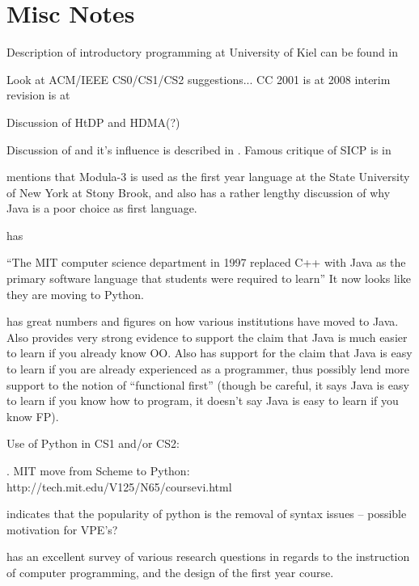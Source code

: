 \label{chapter:problem}

\section{Misc Notes}

Description of introductory programming at University of Kiel can be found in \cite{Huch05}

Look at ACM/IEEE CS0/CS1/CS2 suggestions...  CC 2001 is at \cite{cc2001} 2008 interim revision is at \cite{cs2008}

Discussion of HtDP and HDMA(?)

Discussion of \cite{SICPbook} and it's influence is described in \cite{Flatt04}.  Famous critique of SICP is in \cite{Wadler87}

\cite{Bos98} mentions that Modula-3 is used as the first year language at the State University of New York at Stony Brook, and also has a rather lengthy discussion of why Java is a poor choice as first language.

\cite{Mahmoud04} has 


``The MIT computer science department in 1997 replaced C++ with Java as the primary software language that students were required to learn'' \cite{Benander04}  It now looks like they are moving to Python.

\cite{Benander04} has great numbers and figures on how various institutions have moved to Java.  Also provides very strong evidence to support the claim that Java is much easier to learn if you already know OO.  Also has support for the claim that Java is easy to learn if you are already experienced as a programmer, thus possibly lend more support to the notion of ``functional first'' (though be careful, it says Java is easy to learn if you know how to program, it doesn't say Java is easy to learn if you know FP).


Use of Python in CS1 and/or CS2:

\cite{Radenski06,Shannon03,Agarwal05,Agarwal08}.  MIT move from Scheme to Python: http://tech.mit.edu/V125/N65/coursevi.html

\cite{Necaise08} indicates that the popularity of python is the removal of syntax issues -- possible motivation for VPE's?

\cite{Pears07} has an excellent survey of various research questions in regards to the instruction of computer programming, and the design of the first year course.



